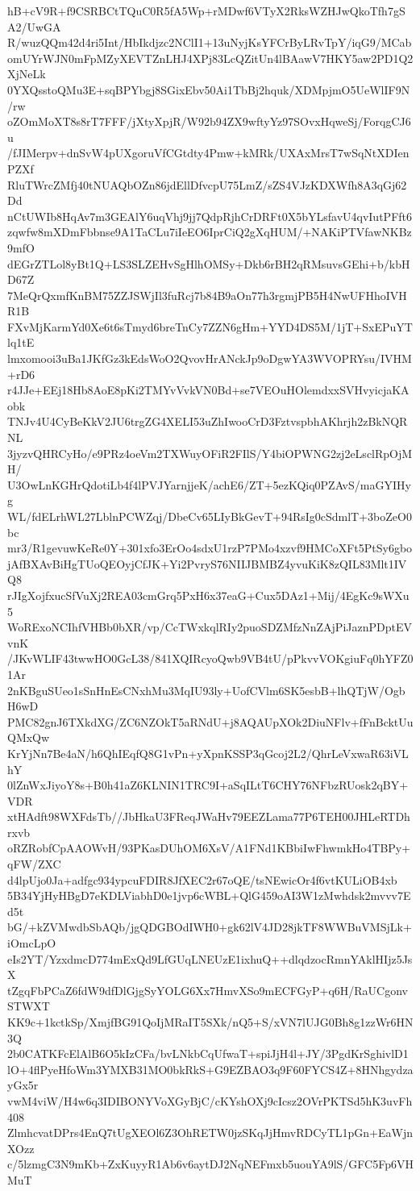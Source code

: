 hB+cV9R+f9CSRBCtTQuC0R5fA5Wp+rMDwf6VTyX2RksWZHJwQkoTfh7gSA2/UwGA
R/wuzQQm42d4ri5Int/HbIkdjzc2NClI1+13uNyjKsYFCrByLRvTpY/iqG9/MCab
omUYrWJN0mFpMZyXEVTZnLHJ4XPj83LcQZitUn4lBAawV7HKY5aw2PD1Q2XjNeLk
0YXQsstoQMu3E+sqBPYbgj8SGixEbv50Ai1TbBj2hquk/XDMpjmO5UeWlIF9N/rw
oZOmMoXT8s8rT7FFF/jXtyXpjR/W92b94ZX9wftyYz97SOvxHqweSj/ForqgCJ6u
/fJIMerpv+dnSvW4pUXgoruVfCGtdty4Pmw+kMRk/UXAxMrsT7wSqNtXDIenPZXf
RluTWrcZMfj40tNUAQbOZn86jdEllDfvcpU75LmZ/sZS4VJzKDXWfh8A3qGj62Dd
nCtUWIb8HqAv7m3GEAlY6uqVhj9jj7QdpRjhCrDRFt0X5bYLsfavU4qvIutPFft6
zqwfw8mXDmFbbnse9A1TaCLu7iIeEO6IprCiQ2gXqHUM/+NAKiPTVfawNKBz9mfO
dEGrZTLol8yBt1Q+LS3SLZEHvSgHlhOMSy+Dkb6rBH2qRMsuvsGEhi+b/kbHD67Z
7MeQrQxmfKnBM75ZZJSWjIl3fuRcj7b84B9aOn77h3rgmjPB5H4NwUFHhoIVHR1B
FXvMjKarmYd0Xe6t6sTmyd6breTnCy7ZZN6gHm+YYD4DS5M/1jT+SxEPuYTlq1tE
lmxomooi3uBa1JKfGz3kEdsWoO2QvovHrANckJp9oDgwYA3WVOPRYsu/IVHM+rD6
r4JJe+EEj18Hb8AoE8pKi2TMYvVvkVN0Bd+se7VEOuHOlemdxxSVHvyicjaKAobk
TNJv4U4CyBeKkV2JU6trgZG4XELI53uZhIwooCrD3FztvspbhAKhrjh2zBkNQRNL
3jyzvQHRCyHo/e9PRz4oeVm2TXWuyOFiR2FIlS/Y4biOPWNG2zj2eLsclRpOjMH/
U3OwLnKGHrQdotiLb4f4lPVJYarnjjeK/achE6/ZT+5ezKQiq0PZAvS/maGYIHyg
WL/fdELrhWL27LblnPCWZqj/DbeCv65LIyBkGevT+94RsIg0cSdmlT+3boZeO0bc
mr3/R1gevuwKeRe0Y+301xfo3ErOo4sdxU1rzP7PMo4xzvf9HMCoXFt5PtSy6gbo
jAfBXAvBiHgTUoQEOyjCfJK+Yi2PvryS76NIIJBMBZ4yvuKiK8zQIL83Mlt1IVQ8
rJIgXojfxucSfVuXj2REA03cmGrq5PxH6x37eaG+Cux5DAz1+Mij/4EgKc9sWXu5
WoRExoNCIhfVHBb0bXR/vp/CcTWxkqlRIy2puoSDZMfzNnZAjPiJaznPDptEVvnK
/JKvWLIF43twwHO0GcL38/841XQIRcyoQwb9VB4tU/pPkvvVOKgiuFq0hYFZ01Ar
2nKBguSUeo1sSnHnEsCNxhMu3MqIU93ly+UofCVlm6SK5esbB+lhQTjW/OgbH6wD
PMC82gnJ6TXkdXG/ZC6NZOkT5aRNdU+j8AQAUpXOk2DiuNFlv+fFnBcktUuQMxQw
KrYjNn7Be4aN/h6QhIEqfQ8G1vPn+yXpnKSSP3qGcoj2L2/QhrLeVxwaR63iVLhY
0lZnWxJiyoY8s+B0h41aZ6KLNIN1TRC9I+aSqILtT6CHY76NFbzRUosk2qBY+VDR
xtHAdft98WXFdsTb//JbHkaU3FReqJWaHv79EEZLama77P6TEH00JHLeRTDhrxvb
oRZRobfCpAAOWvH/93PKasDUhOM6XsV/A1FNd1KBbiIwFhwmkHo4TBPy+qFW/ZXC
d4lpUjo0Ja+adfgc934ypcuFDIR8JfXEC2r67oQE/tsNEwicOr4f6vtKULiOB4xb
5B34YjHyHBgD7eKDLViabhD0e1jvp6cWBL+QlG459oAI3W1zMwhdsk2mvvv7Ed5t
bG/+kZVMwdbSbAQb/jgQDGBOdIWH0+gk62lV4JD28jkTF8WWBuVMSjLk+iOmcLpO
eIs2YT/YzxdmcD774mExQd9LfGUqLNEUzE1ixhuQ++dlqdzocRmnYAklHIjz5JsX
tZgqFbPCaZ6fdW9dfDlGjgSyYOLG6Xx7HmvXSo9mECFGyP+q6H/RaUCgonvSTWXT
KK9c+1kctkSp/XmjfBG91QoIjMRaIT5SXk/nQ5+S/xVN7lUJG0Bh8g1zzWr6HN3Q
2b0CATKFcElAlB6O5kIzCFa/bvLNkbCqUfwaT+spiJjH4l+JY/3PgdKrSghivlD1
lO+4flPyeHfoWm3YMXB31MO0bkRkS+G9EZBAO3q9F60FYCS4Z+8HNhgydzayGx5r
vwM4viW/H4w6q3IDIBONYVoXGyBjC/cKYshOXj9cIcsz2OVrPKTSd5hK3uvFh408
ZlmhcvatDPrs4EnQ7tUgXEOl6Z3OhRETW0jzSKqJjHmvRDCyTL1pGn+EaWjnXOzz
c/5lzmgC3N9mKb+ZxKuyyR1Ab6v6aytDJ2NqNEFmxb5uouYA9lS/GFC5Fp6VHMuT

